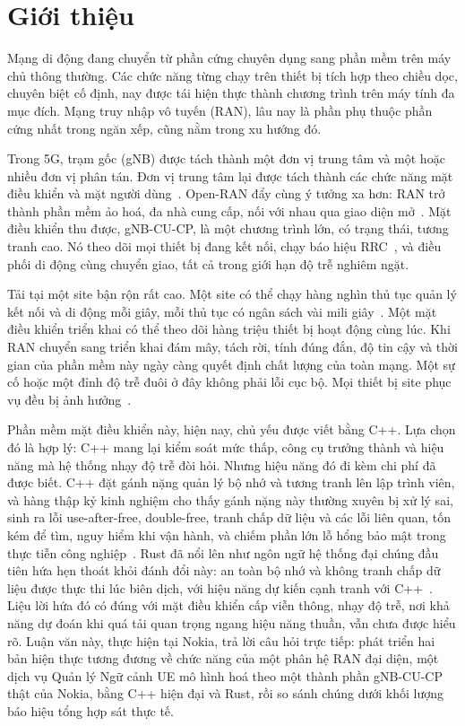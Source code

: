 \chapter{Giới thiệu}

Mạng di động đang chuyển từ phần cứng chuyên dụng sang phần mềm trên máy chủ thông thường.
Các chức năng từng chạy trên thiết bị tích hợp theo chiều dọc, chuyên biệt cố định, nay được
tái hiện thực thành chương trình trên máy tính đa mục đích. Mạng truy nhập vô tuyến (RAN),
lâu nay là phần phụ thuộc phần cứng nhất trong ngăn xếp, cũng nằm trong xu hướng đó.

Trong 5G, trạm gốc (gNB) được tách thành một đơn vị trung tâm và một hoặc nhiều đơn vị phân
tán. Đơn vị trung tâm lại được tách thành các chức năng mặt điều khiển và mặt người
dùng~\cite{3gpp38401,3gpp38300}. Open-RAN đẩy cùng ý tưởng xa hơn: RAN trở thành phần mềm
ảo hoá, đa nhà cung cấp, nối với nhau qua giao diện
mở~\cite{polese2023oran}. Mặt điều khiển thu được, gNB-CU-CP, là một chương trình lớn, có
trạng thái, tương tranh cao. Nó theo dõi mọi thiết bị đang kết nối, chạy báo hiệu
RRC~\cite{3gpp38331}, và điều phối di động cùng chuyển giao, tất cả trong giới hạn độ trễ
nghiêm ngặt.

Tải tại một site bận rộn rất cao. Một site có thể chạy hàng nghìn thủ tục quản lý kết nối và
di động mỗi giây, mỗi thủ tục có ngân sách vài
mili giây~\cite{3gpp38913}. Một mặt điều khiển triển khai có thể theo dõi hàng triệu thiết bị
hoạt động cùng lúc. Khi RAN chuyển sang triển khai đám mây, tách rời, tính đúng đắn, độ tin
cậy và thời gian của phần mềm này ngày càng quyết định chất lượng của toàn mạng. Một sự cố
hoặc một đỉnh độ trễ đuôi ở đây không phải lỗi cục bộ. Mọi thiết bị site phục vụ đều bị
ảnh hưởng~\cite{dean2013tail,barroso2017microseconds}.

Phần mềm mặt điều khiển này, hiện nay, chủ yếu được viết bằng C++. Lựa chọn đó là hợp lý:
C++ mang lại kiểm soát mức thấp, công cụ trưởng thành và hiệu năng mà hệ thống nhạy độ trễ
đòi hỏi. Nhưng hiệu năng đó đi kèm chi phí đã được biết. C++ đặt gánh nặng quản lý bộ nhớ và
tương tranh lên lập trình viên, và hàng thập kỷ kinh nghiệm cho thấy gánh nặng này thường
xuyên bị xử lý sai, sinh ra lỗi use-after-free, double-free, tranh chấp dữ liệu và các lỗi
liên quan, tốn kém để tìm, nguy hiểm khi vận hành, và chiếm phần lớn lỗ hổng bảo mật trong
thực tiễn công nghiệp~\cite{msrc2019memory,google2022android}. Rust đã nổi lên như ngôn ngữ
hệ thống đại chúng đầu tiên hứa hẹn thoát khỏi đánh đổi này: an toàn bộ nhớ và không tranh
chấp dữ liệu được thực thi lúc biên dịch, với hiệu năng dự kiến cạnh tranh với
C++~\cite{klabnik2023rust,jung2018rustbelt}. Liệu lời hứa đó có đúng với mặt điều khiển cấp
viễn thông, nhạy độ trễ, nơi khả năng dự đoán khi quá tải quan trọng ngang hiệu năng thuần,
vẫn chưa được hiểu rõ. Luận văn này, thực hiện tại Nokia, trả lời câu hỏi trực tiếp: phát
triển hai bản hiện thực tương đương về chức năng của một phân hệ RAN đại diện, một dịch vụ
Quản lý Ngữ cảnh UE mô hình hoá theo một thành phần gNB-CU-CP thật của Nokia, bằng C++ hiện
đại và Rust, rồi so sánh chúng dưới khối lượng báo hiệu tổng hợp sát thực tế.

